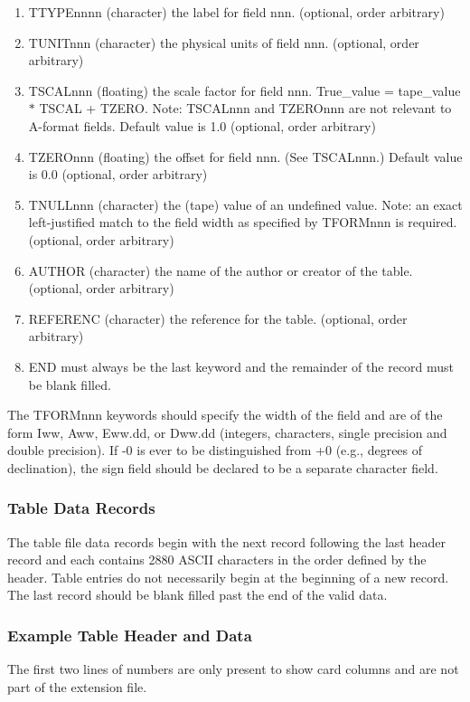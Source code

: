 \begin{enumerate}
\item TTYPEnnnn (character) the label for field nnn. (optional, order
arbitrary)
\item TUNITnnn (character) the physical units of field nnn. (optional, order
arbitrary)
\item TSCALnnn (floating) the scale factor for field nnn. True\_value =
tape\_value $\ast$ TSCAL + TZERO.  Note: TSCALnnn and TZEROnnn are not
relevant to A-format fields. Default value is 1.0 (optional, order
arbitrary)
\item TZEROnnn (floating) the offset for field nnn. (See TSCALnnn.) Default
value is 0.0 (optional, order arbitrary)
\item TNULLnnn (character) the (tape) value of an undefined value. Note: an
exact left-justified match to the field width as specified by TFORMnnn
is required. (optional, order arbitrary)
\item AUTHOR (character) the name of the author or creator of the table.
(optional, order arbitrary)
\item REFERENC (character) the reference for the table. (optional, order
arbitrary)
\item END must always be the last keyword and the remainder of the record
must be blank filled.
\end{enumerate} %
The TFORMnnn keywords should specify the width of the field and are of
the form Iww, Aww, Eww.dd, or Dww.dd (integers, characters, single
precision and double precision).  If -0 is ever to be distinguished
from +0 (e.g., degrees of declination), the sign field should be
declared to be a separate character field.

\subsubsection{Table Data Records }
The table file data records begin with the next record following the
last header record and each contains 2880 ASCII characters in the
order defined by the header.  Table entries do not necessarily begin
at the beginning of a new record.  The last record should be blank
filled past the end of the valid data.

\subsubsection{Example Table Header and Data }
The first two lines of numbers are only present to show card columns
and are not part of the extension file.

